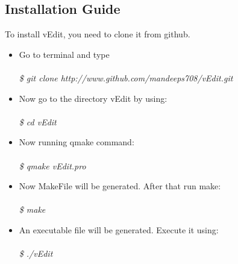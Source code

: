 \subsection{Installation Guide}
To install vEdit, you need to clone it from github.
\begin{itemize}
\item Go to terminal and type\\\\
\textit{\$ git clone http://www.github.com/mandeeps708/vEdit.git}
\item Now go to the directory vEdit by using: \\\\
\textit{\$ cd vEdit}
\item Now running qmake command: \\\\
\textit{\$ qmake vEdit.pro}
\item Now MakeFile will be generated. After that run make: \\\\
\textit{\$ make}
\item An executable file will be generated. Execute it using: \\\\
\textit{\$ ./vEdit}
\end{itemize}